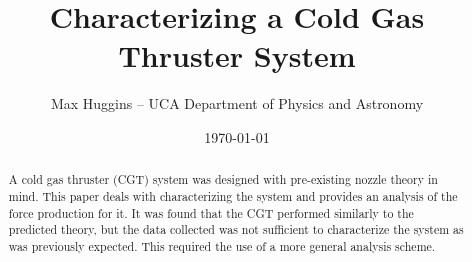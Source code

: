 \documentclass[letterpaper,12pt]{article}
\begin{document}
\title{Characterizing a Cold Gas Thruster System}
\author{Max Huggins – UCA Department of Physics and Astronomy}
\date{\today}
\maketitle


\begin{abstract}
A cold gas thruster (CGT) system was designed with pre-existing nozzle theory in mind. This paper deals with characterizing the system and provides an analysis of the force production for it. It was found that the CGT performed similarly to the predicted theory, but the data collected was not sufficient to characterize the system as was previously expected. This required the use of a more general analysis scheme.
\end{abstract}
\end{document}
